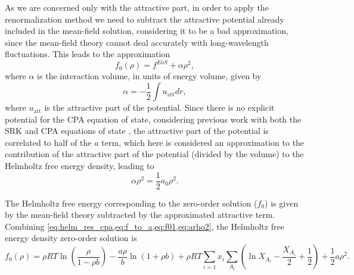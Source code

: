 \documentclass[preprint,12pt,3p]{elsarticle}
\begin{document}
    As we are concerned only with the attractive part, in order to apply the renormalization method we need to subtract the attractive potential already included in the mean-field solution, considering it to be a bad approximation, since the mean-field theory cannot deal accurately with long-wavelength fluctuations. This leads to the approximation
\begin{equation} \label{eq:f01}
    f_{0}(\rho) = f^{EoS} + \alpha\rho^2,
\end{equation}
	where $\alpha$ is the interaction volume, in units of energy volume, given by
\begin{equation} \label{eq:alphav}
    \alpha = -\frac{1}{2} \int u_\text{att} dr,
\end{equation}
	where $u_\text{att}$ is the attractive part of the potential. Since there is no explicit potential for the CPA equation of state, considering previous work with both the SRK and CPA equations of state \cite{cai2004thermodynamics,pcm2017application,xu2010crossover}, the attractive part of the potential is correlated to half of the $a$ term, which here is considered an approximation to the contribution of the attractive part of the potential (divided by the volume) to the Helmholtz free energy density, leading to 
\begin{equation} \label{eq:arho2}
    \alpha\rho^2 = \frac{1}{2}a_{0}\rho^2.
\end{equation}

    The Helmholtz free energy corresponding to the zero-order solution ($f_{0}$) is given by the mean-field theory subtracted by the approximated attractive term. Combining \cref{eq:helm_res_cpa,eq:f_to_a,eq:f01,eq:arho2}, the Helmholtz free energy density zero-order solution is
\begin{equation} \label{eq:f00}
f_{0}(\rho) = \rho RT\ln\left(\frac{\rho}{1-\rho b}\right)-\frac{a\rho}{b}\ln(1+\rho b) + \rho RT\sum_{i=1} x_{i} \sum_{A_{i}}\left(\ln X_{A_{i}} - \frac{X_{A_{i}}}{2} + \frac{1}{2}\right) + \frac{1}{2} a\rho^2.
\end{equation}  
\end{document}
